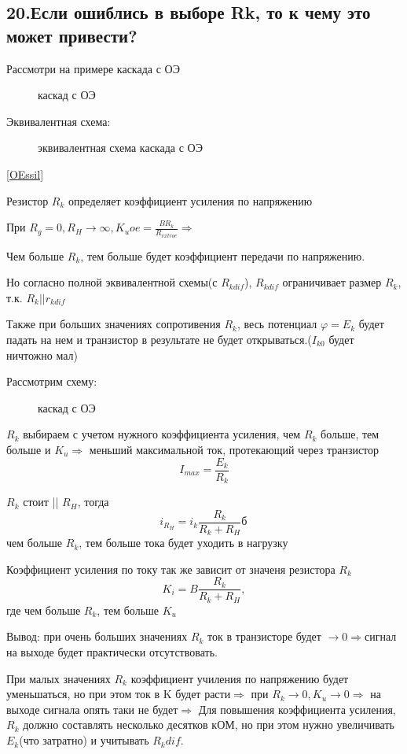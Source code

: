 

\subsection{20.Если ошиблись в выборе Rk, то к чему это может привести?}
  Рассмотри на примере каскада с ОЭ
  \begin{center}
	\begin{figure}[h!]
		\caption{каскад с ОЭ}	
		\label{OE}
	\end{figure}
\end{center}

Эквивалентная схема:

  \begin{center}
	\begin{figure}[h!]
		\caption{эквивалентная схема каскада с ОЭ}	
		\label{EOE}
	\end{figure}
\end{center}

\ref{OEssil}

Резистор $R_k$ определяет коэффициент усиления по напряжению

При $R_g=0,R_H\rightarrow\infty   ,K_uoe=\frac{BR_k}{R_{vxtroe}}\Rightarrow$

Чем больше $R_k$, тем больше будет коэффициент передачи по напряжению.

Но согласно полной эквивалентной схемы(с $R_{kdif}$), $R_{kdif}$ ограничивает размер $R_{k}$, т.к. $R_k||r_{kdif}$

Также при больших значениях сопротивения $R_k$, весь потенциал $\varphi=E_k$ будет падать на нем и транзистор в результате не будет открываться.($I_{k0}$ будет ничтожно мал)

Рассмотрим схему:
  \begin{center}
	\begin{figure}[h!]
		\caption{каскад с ОЭ}	
		\label{20_1}
	\end{figure}
\end{center}

$R_k$ выбираем с учетом нужного коэффициента усиления, чем $R_k$ больше, тем больше и $K_u\Rightarrow$ меньший максимальной ток, протекающий через транзистор 
$$I_{max}=\frac{E_k}{R_k}$$

$R_k$ стоит || $R_H$, тогда
$$
i_{R_H}=i_k\frac{R_k}{R_k+R_H}б\,
$$
чем больше $R_k$, тем больше тока будет уходить в нагрузку

Коэффициент усиления по току так же зависит от значеня резистора $R_k$
$$
K_i=B\frac{R_k}{R_k+R_H}, 
$$
где чем больше $R_k$, тем больше $K_u$

Вывод: при очень больших значениях $R_k$ ток в транзисторе будет $\rightarrow0\Rightarrow$сигнал на выходе будет практически отсутствовать.

При малых значениях $R_k$ коэффициент училения по напряжению будет уменьшаться, но при этом ток в K будет расти$\Rightarrow$ при $R_k\rightarrow0,K_u\rightarrow0\Rightarrow$ на выходе сигнала опять таки не будет$\Rightarrow$ Для повышения коэффициента усиления, $R_k$ должно составлять несколько десятков кОМ, но при этом нужно увеличивать $E_k$(что затратно) и учитывать $R_kdif$. 